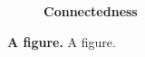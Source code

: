 \begin{figure}
\begin{adjustbox}{minipage=\dimexpr{}\fboxrule,fbox}
\begin{subfigure}[b]{0.475\textwidth}
            \caption[Connectedness]{\textbf{Connectedness}}
            \label{fig:1.0.3b}
        \end{subfigure}
    \end{adjustbox}
    \caption[A figure]{\textbf{A figure.} A figure.}
    \label{fig:1.0.3}
\end{figure}

\blindtext

